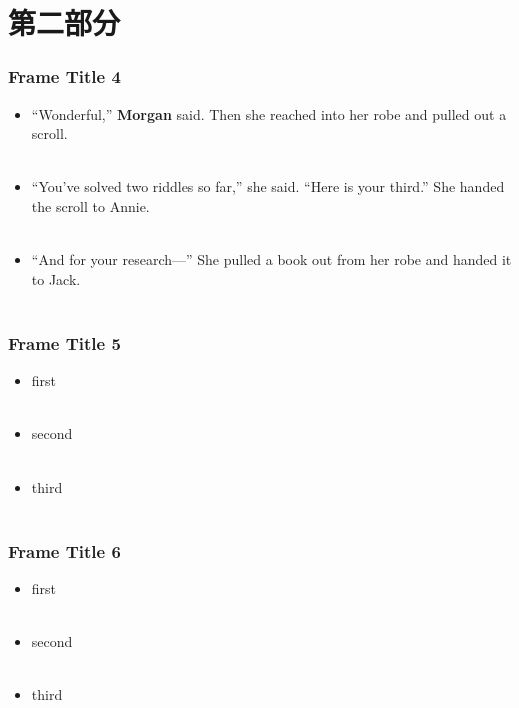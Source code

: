 \documentclass[10pt,aspectratio=43]{beamer} %
\begin{document}
	\section{第二部分}
	\begin{frame}
		\frametitle{Frame Title 4}
		\begin{itemize} 
			\item “Wonderful,” \textbf {Morgan} said. Then she reached into her robe and pulled out a scroll. \\~\\
			\item “You’ve solved two riddles so far,” she said. “Here is your third.” She handed the scroll to Annie. \\~\\
			\item  “And for your research—” She pulled a book out from her robe and handed it to Jack. \\~\\
		\end{itemize}
	\end{frame}
	\begin{frame}
		\frametitle{Frame Title 5}
		\begin{itemize} 
			\item first \\~\\
			\item second \\~\\
			\item third \\~\\
		\end{itemize}
	\end{frame}
	\begin{frame}
		\frametitle{Frame Title 6}
		\begin{itemize} 
			\item first \\~\\
			\item second \\~\\
			\item third \\~\\
		\end{itemize}
	\end{frame}
\end{document}
